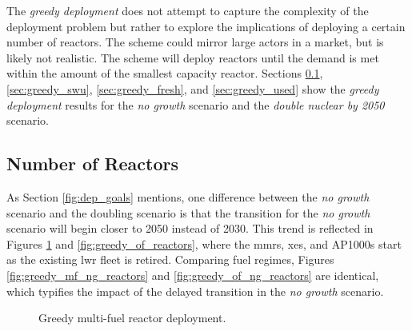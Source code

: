 The \textit{greedy deployment} does not attempt to capture the complexity of the deployment problem but rather to explore the implications of deploying a certain number of reactors. The scheme could mirror large actors in a market, but is likely not realistic. The scheme will deploy reactors until the demand is met within the amount of the smallest capacity reactor. Sections \ref{sec:greedy_reactors}, \ref{sec:greedy_swu}, \ref{sec:greedy_fresh}, and \ref{sec:greedy_used} show the \textit{greedy deployment} results for the \textit{no growth} scenario and the \textit{double nuclear by 2050} scenario.

\subsection{Number of Reactors}
\label{sec:greedy_reactors}

As Section \ref{fig:dep_goals} mentions, one difference between the \textit{no growth} scenario and the doubling scenario is that the transition for the \textit{no growth} scenario will begin closer to 2050 instead of 2030. This trend is reflected in Figures \ref{fig:greedy_mf_reactors} and \ref{fig:greedy_of_reactors}, where the \glspl{mmr}, \glspl{xe}, and AP1000s start as the existing \gls{lwr} fleet is retired. Comparing fuel regimes, Figures \ref{fig:greedy_mf_ng_reactors} and \ref{fig:greedy_of_ng_reactors} are identical, which typifies the impact of the delayed transition in the \textit{no growth} scenario.


\begin{figure}[H]
    \hfill
    \caption{Greedy multi-fuel reactor deployment.}
    \label{fig:greedy_mf_reactors}
\end{figure}

